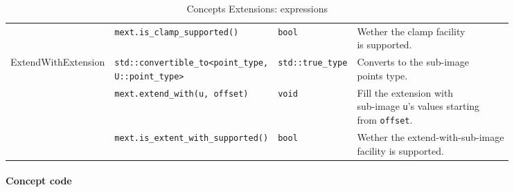 \begin{table}[htbp]
\begin{scriptsize}
\begin{tabular}{llll}
      \multicolumn{1}{c|}{}                                        & \texttt{mext.is\_clamp\_supported()}          &
      \texttt{bool}                                                & \makecell[l]{Wether the clamp facility                                                    \\is supported.}                                       \\
      \cline{1-4}
      \multicolumn{1}{c|}{\multirow{3}{*}{ExtendWithExtension}}    &
      \makecell[l]{\texttt{std::convertible\_to<point\_type,}                                                                                                  \\\texttt{U::point\_type>}} & \texttt{std::true\_type} &
      \makecell[l]{Converts to the sub-image                                                                                                                   \\ points type.}                                                                                                       \\
      \multicolumn{1}{c|}{}                                        & \texttt{mext.extend\_with(u, offset)}         &
      \texttt{void}                                                & \makecell[l]{Fill the extension with                                                      \\sub-image      \texttt{u}'s values  starting \\ from \texttt{offset}.} \\
      \multicolumn{1}{c|}{}                                        & \texttt{mext.is\_extent\_with\_supported()}   &
      \texttt{bool}                                                & \makecell[l]{Wether the extend-with-sub-image                                             \\ facility is
      supported.}                                                                                                                                              \\
      \cline{1-4}
    \end{tabular}
    \smallskip

    \caption{Concepts Extensions: expressions}
  \end{scriptsize}
  \label{table:concept.extensions.expressions}
\end{table}

\paragraph{Concept code}

